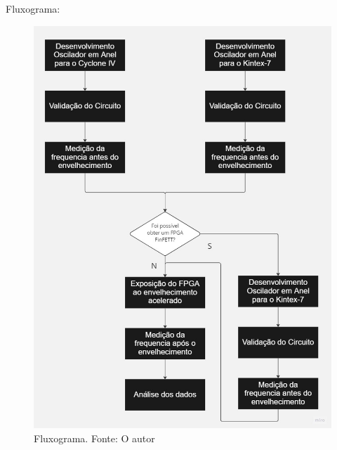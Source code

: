 Fluxograma:
\begin{figure}[H]
    \centering
    \includegraphics[width=\linewidth]{figures/Flowchart.jpg}
    \caption{Fluxograma. Fonte: O autor}
    \label{fig:Flowchart}
\end{figure}